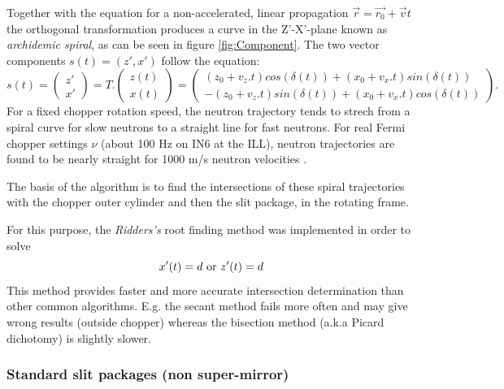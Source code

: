 Together with the equation for a non-accelerated, linear propagation $\vec{r} = \vec{r_0}+\vec{v}t$ the orthogonal transformation produces a curve in the Z'-X'-plane known as \emph{archidemic spiral}, as can be seen in figure \ref{fig:Component}. The two vector components $s(t) = (z',x')$ follow the equation:
\begin{equation}
s(t) = \left(
\begin{array}{c}
z' \\
x'
\end{array}
\right) = T.\left(
\begin{array}{c}
z(t) \\
x(t)
\end{array}
\right) = \left(
\begin{array}{c}
(z_0+v_z.t)cos(\delta(t)) + (x_0+v_x.t)sin(\delta(t)) \\
-(z_0+v_z.t)sin(\delta(t)) + (x_0+v_x.t)cos(\delta(t))
\end{array}
\right).
\label{eq:Txz}
\end{equation}
For a fixed chopper rotation speed, the neutron trajectory tends to strech from a spiral curve for slow neutrons to a straight line for fast neutrons. For real Fermi chopper settings $\nu$ (about 100 Hz on IN6 at the ILL), neutron trajectories are found to be nearly straight for 1000 m/s neutron velocities \cite{blanc83}.

The basis of the algorithm is to find the intersections of these spiral trajectories with the chopper outer cylinder and then the slit package, in the rotating frame.

For this purpose, the \emph{Ridders's} root finding method was implemented \cite{NumRecip} in order to solve
\begin{equation}
x'(t) = d {\rm\ or\ } z'(t) = d
\label{eq:Ridder}
\end{equation}
This method provides faster and more accurate intersection determination than other common algorithms. E.g. the secant method fails more often and may give wrong results (outside chopper) whereas the bisection method (a.k.a Picard dichotomy) is slightly slower.

\subsubsection{Standard slit packages (non super-mirror)}

